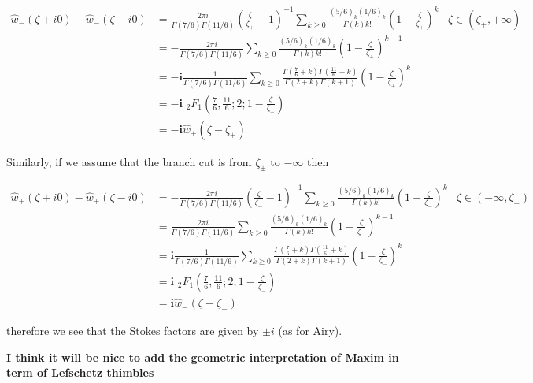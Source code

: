 \documentclass[11pt,a4paper,twoside,leqno,noamsfonts]{amsart}
\numberwithin{equation}{section}
\begin{document}
\begin{align*}
\hat{w}_-(\zeta+i0)-\hat{w}_-(\zeta-i0)&=\frac{2\pi i}{\Gamma(7/6)\Gamma(11/6)}\left(\frac{\zeta}{\zeta_+}-1\right)^{-1}\sum_{k\geq 0}\frac{(5/6)_k(1/6)_k}{\Gamma(k)k!}\left(1-\frac{\zeta}{\zeta_+}\right)^k & \zeta\in\left(\zeta_+,+\infty\right) & \\
&=-\frac{2\pi i}{\Gamma(7/6)\Gamma(11/6)} \sum_{k\geq 0}\frac{(5/6)_k(1/6)_k}{\Gamma(k)k!}\left(1-\frac{\zeta}{\zeta_+}\right)^{k-1} & \\
&=\mathbf{-i}\frac{1}{\Gamma(7/6)\Gamma(11/6)}\sum_{k\geq 0}\frac{\Gamma\left(\tfrac{7}{6}+k\right)\Gamma\left(\tfrac{11}{6}+k\right)}{\Gamma(2+k)\Gamma(k+1)}\left(1-\frac{\zeta}{\zeta_+}\right)^k & \\
&=\mathbf{-i}\,\, {}_2F_1\left(\frac{7}{6},\frac{11}{6};2;1-\frac{\zeta}{\zeta_+}\right) & \\
&=\mathbf{-i}\hat{w}_+(\zeta-\zeta_+)
\end{align*}

Similarly, if we assume that the branch cut is from $\zeta_{\pm}$ to $-\infty$ then

\begin{align*}
\hat{w}_+(\zeta+i0)-\hat{w}_+(\zeta-i0)&=-\frac{2\pi i}{\Gamma(7/6)\Gamma(11/6)}\left(\frac{\zeta}{\zeta_-}-1\right)^{-1}\sum_{k\geq 0}\frac{(5/6)_k(1/6)_k}{\Gamma(k)k!}\left(1-\frac{\zeta}{\zeta_-}\right)^k & \zeta\in\left(-\infty,\zeta_-\right) & \\
&=\frac{2\pi i}{\Gamma(7/6)\Gamma(11/6)} \sum_{k\geq 0}\frac{(5/6)_k(1/6)_k}{\Gamma(k)k!}\left(1-\frac{\zeta}{\zeta_-}\right)^{k-1} & \\
&=\mathbf{i}\frac{1}{\Gamma(7/6)\Gamma(11/6)}\sum_{k\geq 0}\frac{\Gamma\left(\tfrac{7}{6}+k\right)\Gamma\left(\tfrac{11}{6}+k\right)}{\Gamma(2+k)\Gamma(k+1)}\left(1-\frac{\zeta}{\zeta_-}\right)^k & \\
&=\mathbf{i}\,\, {}_2F_1\left(\frac{7}{6},\frac{11}{6};2;1-\frac{\zeta}{\zeta_-}\right) & \\
&=\mathbf{i}\hat{w}_-(\zeta-\zeta_-)
\end{align*}

therefore we see that the Stokes factors are given by $\pm i$ (as for Airy). 

\textbf{I think it will be nice to add the geometric interpretation of Maxim in term of Lefschetz thimbles}
\end{document}
